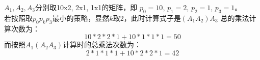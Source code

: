 \begin{solution}
    $A_1,A_2,A_3$分别取10x2, 2x1, 1x1的矩阵，即
    $p_0=10$, $p_1=2$, $p_2=1$, $p_3=1$。\\
    若按照取$p_0p_kp_3$最小的策略，显然$k$取2，此时计算式子是$(A_1A_2)A_3$
    总的乘法计算次数为：
    $$10*2*2*1+10*1*1*1 = 50$$
    而按照$A_1(A_2A_3)$计算时的总乘法次数为：
    $$2*1*1*1 + 10*2*2*1 = 42$$
\end{solution}